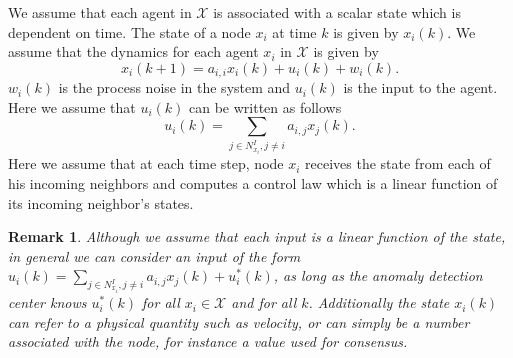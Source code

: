\documentclass[letterpaper, 10 pt, conference]{ieeeconf}
\newtheorem{remark}[theorem]{Remark}
\begin{document}
We assume that each agent in $\mathcal{X}$ is associated with a scalar state which is dependent on time. The state of a node $x_i$ at time $k$ is given by $x_i(k)$. We assume that the dynamics for each agent $x_i$ in $\mathcal{X}$ is given by
\begin{equation}
x_i(k+1) = a_{i,i}x_i(k) + u_i(k) + w_i(k).
\end{equation}
$w_i(k)$ is the process noise in the system and $u_i(k)$ is the input to the agent. Here we assume that $u_i(k)$ can be written as follows
\begin{equation}
u_i(k) = \sum_{j \in N_{x_i}^I, j \neq i} a_{i,j} x_j(k).
\end{equation}
Here we assume that at each time step, node $x_i$ receives the state from each of his incoming neighbors and computes a control law which is a linear function of its incoming neighbor's states. 
\begin{remark}
Although we assume that each input is a linear function of the state, in general we can consider an input of the form $u_i(k) = \sum_{j \in N_{x_i}^I, j \neq i} a_{i,j} x_j(k) + u_i^*(k)$, as long as the anomaly detection center knows $u_i^*(k)$ for all $x_i \in \mathcal{X}$ and for all $k$. Additionally the state $x_i(k)$ can refer to a physical quantity such as velocity, or can simply be a number associated with the node, for instance a value used for consensus.
\end{remark}
\end{document}
